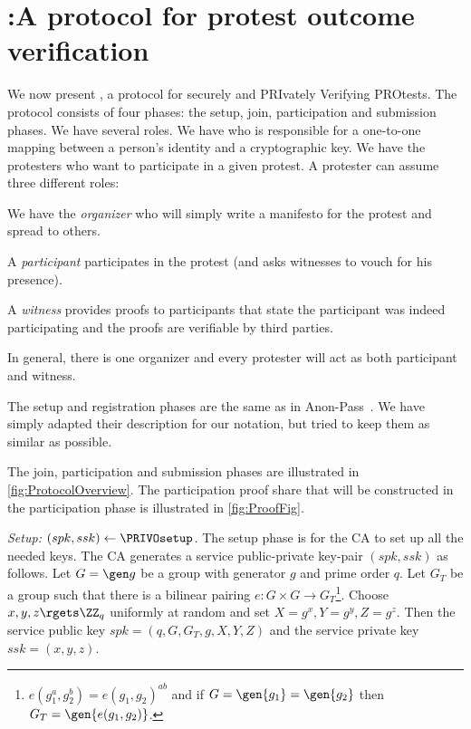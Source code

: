 \section{\PRIVO:\@ A protocol for protest outcome verification}%
\label{protocol}


We now present \PRIVO, a protocol for securely and PRIvately Verifying PROtests.
The protocol consists of four phases: the setup, join, participation and 
submission phases.
We have several roles.
We have  who is responsible for a one-to-one mapping between a person's 
identity and a cryptographic key.
We have the protesters who want to participate in a given protest.
A protester can assume three different roles:
\begin{enumerate*}
\item We have the \emph{organizer} who will simply write a manifesto for the 
  protest and spread to others.
\item A \emph{participant} participates in the protest (and asks witnesses to 
  vouch for his presence).
\item A \emph{witness} provides proofs to participants that state the 
  participant was indeed participating and the proofs are verifiable by third 
  parties.
\end{enumerate*}
In general, there is one organizer and every protester will act as both 
participant and witness.

The setup and registration phases are the same as in Anon-Pass~\cite{AnonPass}.
We have simply adapted their description for our notation, but tried to keep 
them as similar as possible.

The join, participation and submission phases are illustrated in 
\cref{fig:ProtocolOverview}.
The participation proof share that will be constructed in the participation 
phase is illustrated in \cref{fig:ProofFig}.


\emph{Setup: \((spk, ssk)\gets \PRIVOsetup\).}
The setup phase is for the \ac{CA} to set up all the needed keys.
The \ac{CA} generates a service public-private key-pair \((spk, ssk)\) as 
follows.
Let \(G = \gen g\) be a group with generator \(g\) and prime order \(q\).
Let \(G_T\) be a group such that there is a bilinear pairing \(e\colon G\times 
  G\to G_T\)\footnote{%
  \Ie \(e(g_1^a, g_2^b) = e(g_1, g_2)^{ab}\) and if \(G = \gen{g_1} = 
    \gen{g_2}\) then \(G_T = \gen{e(g_1, g_2)}\).
}.
Choose \(x,y,z\rgets \ZZ_q\) uniformly at random and set \(X = g^x, Y = g^y, Z = 
  g^z\).
Then the service public key \(spk = (q, G, G_T, g, X, Y, Z)\) and the service 
private key \(ssk = (x, y, z)\).

